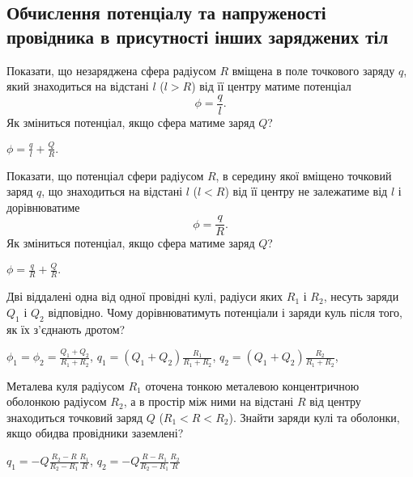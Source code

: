 \subsection*{Обчислення потенціалу та напруженості провідника в присутності інших заряджених тіл}


\begin{problem}\label{potential_of_sphere_in_particle_field}
	Показати, що незаряджена сфера радіусом $R$ вміщена в поле точкового заряду $q$, який знаходиться на відстані $l$ ($l > R$) від її центру матиме потенціал 
	\[
		\phi = \frac{q}{l}.
	\]
	Як зміниться потенціал, якщо сфера матиме заряд $Q$?
	\begin{solution}
		$\phi = \frac{q}{l} + \frac{Q}{R}.$
	\end{solution}
\end{problem}


\begin{problem}
	Показати, що потенціал сфери радіусом $R$, в середину якої вміщено точковий заряд $q$, що знаходиться на відстані $l$ ($l <R$) від її центру не залежатиме від $l$ і дорівнюватиме 
	\[
	\phi = \frac{q}{R}.
	\]
	Як зміниться потенціал, якщо сфера матиме заряд $Q$?
	\begin{solution}
		$\phi = \frac{q}{R} + \frac{Q}{R}.$
	\end{solution}
\end{problem}

\begin{problem}\label{connecting_spheres}
Дві віддалені одна від одної провідні кулі, радіуси яких $R_1$ і $R_2$, несуть заряди $Q_1$ і $Q_2$ відповідно. Чому дорівнюватимуть потенціали і заряди куль після того, як їх з'єднають дротом?
\begin{solution}
	$\phi_1 = \phi_2 = \frac{Q_1 + Q_2}{R_1 + R_2}$, $q_1 = (Q_1 + Q_2) \frac{R_1}{R_1 + R_2}$, $q_2 = (Q_1 + Q_2) \frac{R_2}{R_1 + R_2}$,
\end{solution}
\end{problem}

\begin{problem}
Металева куля радіусом $R_1$ оточена тонкою металевою концентричною оболонкою радіусом $R_2$, а в простір між ними на відстані $R$ від центру знаходиться точковий заряд $Q$ ($R_1 <R <R_2$). Знайти заряди кулі та оболонки, якщо обидва провідники заземлені?
\begin{solution}
	$q_1 = -Q\frac{R_2-R}{R_2-R_1}\frac{R_1}{R}$, $q_2 = -Q\frac{R-R_1}{R_2-R_1}\frac{R_2}{R}$
\end{solution}
\end{problem}

